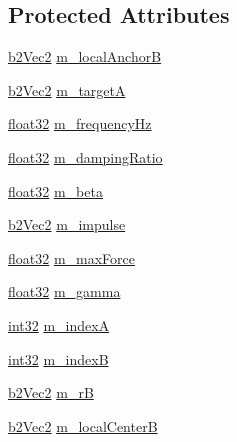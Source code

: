 \subsection*{Protected Attributes}
\begin{DoxyCompactItemize}
\item 
\mbox{\hyperlink{structb2_vec2}{b2\+Vec2}} \mbox{\hyperlink{classb2_mouse_joint_a11564027dbf4ecbe593d6b8c3b634ea8}{m\+\_\+local\+AnchorB}}
\item 
\mbox{\hyperlink{structb2_vec2}{b2\+Vec2}} \mbox{\hyperlink{classb2_mouse_joint_a4196e32b3b8dfca298e37b7787245c6f}{m\+\_\+targetA}}
\item 
\mbox{\hyperlink{b2_settings_8h_aacdc525d6f7bddb3ae95d5c311bd06a1}{float32}} \mbox{\hyperlink{classb2_mouse_joint_a17a95ce26e366e288ca19e65abf6fd6b}{m\+\_\+frequency\+Hz}}
\item 
\mbox{\hyperlink{b2_settings_8h_aacdc525d6f7bddb3ae95d5c311bd06a1}{float32}} \mbox{\hyperlink{classb2_mouse_joint_afdd1fd651a936ce0afc85decd67b7e1c}{m\+\_\+damping\+Ratio}}
\item 
\mbox{\hyperlink{b2_settings_8h_aacdc525d6f7bddb3ae95d5c311bd06a1}{float32}} \mbox{\hyperlink{classb2_mouse_joint_afb358e67d625526316bc2f53a1e3cae0}{m\+\_\+beta}}
\item 
\mbox{\hyperlink{structb2_vec2}{b2\+Vec2}} \mbox{\hyperlink{classb2_mouse_joint_ae35319e2e64dbf3c48dd20fe8c031ebd}{m\+\_\+impulse}}
\item 
\mbox{\hyperlink{b2_settings_8h_aacdc525d6f7bddb3ae95d5c311bd06a1}{float32}} \mbox{\hyperlink{classb2_mouse_joint_a4659e3fee0beaeac207a013095748bc1}{m\+\_\+max\+Force}}
\item 
\mbox{\hyperlink{b2_settings_8h_aacdc525d6f7bddb3ae95d5c311bd06a1}{float32}} \mbox{\hyperlink{classb2_mouse_joint_a63257ae0faad5c8ff00c92a4eaac50e0}{m\+\_\+gamma}}
\item 
\mbox{\hyperlink{b2_settings_8h_a43d43196463bde49cb067f5c20ab8481}{int32}} \mbox{\hyperlink{classb2_mouse_joint_ae6f4a011469a55cd2c61e8338fbd4994}{m\+\_\+indexA}}
\item 
\mbox{\hyperlink{b2_settings_8h_a43d43196463bde49cb067f5c20ab8481}{int32}} \mbox{\hyperlink{classb2_mouse_joint_a5b2c7802674942419c89f140c7db85b3}{m\+\_\+indexB}}
\item 
\mbox{\hyperlink{structb2_vec2}{b2\+Vec2}} \mbox{\hyperlink{classb2_mouse_joint_a00510096c1433e6d7e671cf5bbb1c118}{m\+\_\+rB}}
\item 
\mbox{\hyperlink{structb2_vec2}{b2\+Vec2}} \mbox{\hyperlink{classb2_mouse_joint_ad9947876df55f4b4e7d435941234e22e}{m\+\_\+local\+CenterB}}

\end{DoxyCompactItemize}
